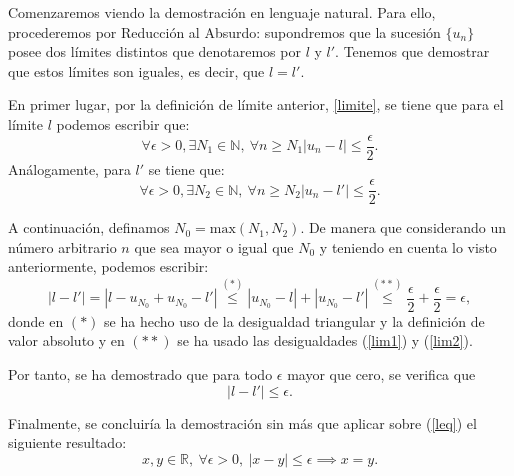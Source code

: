 \begin{demostracion}
  Comenzaremos viendo la demostración en lenguaje natural. Para ello, 
  procederemos por Reducción al Absurdo: supondremos que la sucesión 
  \( \{ u_n\}\) posee dos límites distintos que denotaremos por \( l\) 
  y \(l'\). Tenemos que demostrar que estos límites son iguales, 
  es decir, que \(l=l'\). 
  
  En primer lugar, por la definición de límite anterior, \ref{limite}, 
  se tiene que para el límite \(l \) podemos escribir que:
  \begin{equation}\label{lim1}
  \forall \epsilon >0, \exists N_1 \in \mathbb{N}, \ \forall n 
  \geq N_1 |u_n-l| \leq \frac{\epsilon}{2}.
  \end{equation}
  Análogamente, para \(l'\) se tiene que:
  \begin{equation}\label{lim2}
  \forall \epsilon >0, \exists N_2 \in \mathbb{N}, \ \forall n 
  \geq N_2 |u_n-l'| \leq \frac{\epsilon}{2}.
  \end{equation}
  
  A continuación, definamos \( N_0 = \text{max} (N_1,N_2)\). 
  De manera que considerando un número arbitrario \(n\) que 
  sea mayor o igual que \(N_0\) y teniendo en cuenta lo visto anteriormente, 
  podemos escribir:
  \begin{equation*}
  |l-l'|=|l-u_{N_0}+u_{N_0}-l'| \stackrel{(*)}{\leq} 
  |u_{N_0}-l|+|u_{N_0}-l'| \stackrel{(**)}{\leq} 
  \frac{\epsilon}{2}+\frac{\epsilon}{2}=\epsilon,
  \end{equation*}
  donde en \((*)\) se ha hecho uso de la desigualdad triangular y la 
  definición de valor absoluto y en \((**)\) se ha usado las 
  desigualdades (\ref{lim1}) y (\ref{lim2}).
  
  Por tanto, se ha demostrado que para todo \(\epsilon\) mayor que cero, 
  se verifica que
  \begin{equation}\label{leq}
  |l-l'| \leq \epsilon.
  \end{equation} 
  
   Finalmente, se concluiría la demostración sin más que aplicar 
   sobre (\ref{leq}) el siguiente resultado:
	\begin{equation}
  	x,y \in \mathbb{R}, \ \forall \epsilon >0, \ |x-y| \leq 
  	\epsilon \implies x=y.
  	\end{equation}
\end{demostracion}

